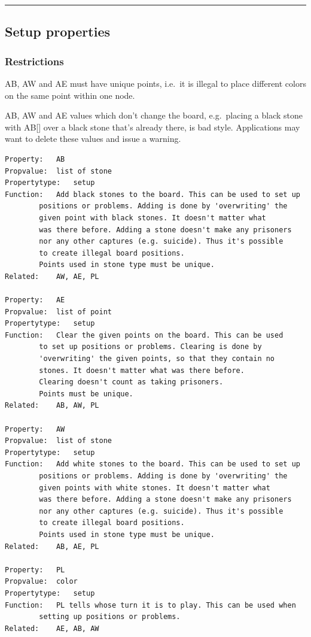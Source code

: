 \begin{center}\rule{0.5\linewidth}{0.5pt}\end{center}

\subsection{Setup properties}\label{setup-properties}

\subsubsection{Restrictions}\label{restrictions}

AB, AW and AE must have unique points, i.e.~it is illegal to place
different colors on the same point within one node.

AB, AW and AE values which don't change the board, e.g.~placing a black
stone with AB{[}{]} over a black stone that's already there, is bad
style. Applications may want to delete these values and issue a warning.

\begin{verbatim}
Property:   AB
Propvalue:  list of stone
Propertytype:   setup
Function:   Add black stones to the board. This can be used to set up
        positions or problems. Adding is done by 'overwriting' the
        given point with black stones. It doesn't matter what
        was there before. Adding a stone doesn't make any prisoners
        nor any other captures (e.g. suicide). Thus it's possible
        to create illegal board positions.
        Points used in stone type must be unique.
Related:    AW, AE, PL

Property:   AE
Propvalue:  list of point
Propertytype:   setup
Function:   Clear the given points on the board. This can be used
        to set up positions or problems. Clearing is done by
        'overwriting' the given points, so that they contain no
        stones. It doesn't matter what was there before.
        Clearing doesn't count as taking prisoners.
        Points must be unique.
Related:    AB, AW, PL

Property:   AW
Propvalue:  list of stone
Propertytype:   setup
Function:   Add white stones to the board. This can be used to set up
        positions or problems. Adding is done by 'overwriting' the
        given points with white stones. It doesn't matter what
        was there before. Adding a stone doesn't make any prisoners
        nor any other captures (e.g. suicide). Thus it's possible
        to create illegal board positions.
        Points used in stone type must be unique.
Related:    AB, AE, PL

Property:   PL
Propvalue:  color
Propertytype:   setup
Function:   PL tells whose turn it is to play. This can be used when
        setting up positions or problems.
Related:    AE, AB, AW
\end{verbatim}

